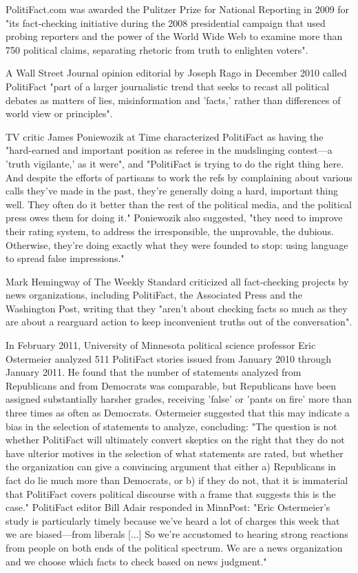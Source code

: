 PolitiFact.com was awarded the Pulitzer Prize for National Reporting in
2009 for "its fact-checking initiative during the 2008 presidential
campaign that used probing reporters and the power of the World Wide Web
to examine more than 750 political claims, separating rhetoric from
truth to enlighten voters".

A Wall Street Journal opinion editorial by Joseph Rago in December 2010
called PolitiFact "part of a larger journalistic trend that seeks to
recast all political debates as matters of lies, misinformation and
'facts,' rather than differences of world view or principles".

TV critic James Poniewozik at Time characterized PolitiFact as having
the "hard-earned and important position as referee in the mudslinging
contest---a 'truth vigilante,' as it were", and "PolitiFact is trying to
do the right thing here. And despite the efforts of partisans to work
the refs by complaining about various calls they've made in the past,
they're generally doing a hard, important thing well. They often do it
better than the rest of the political media, and the political press
owes them for doing it." Poniewozik also suggested, "they need to
improve their rating system, to address the irresponsible, the
unprovable, the dubious. Otherwise, they're doing exactly what they were
founded to stop: using language to spread false impressions."

Mark Hemingway of The Weekly Standard criticized all fact-checking
projects by news organizations, including PolitiFact, the Associated
Press and the Washington Post, writing that they "aren't about checking
facts so much as they are about a rearguard action to keep inconvenient
truths out of the conversation".

In February 2011, University of Minnesota political science professor
Eric Ostermeier analyzed 511 PolitiFact stories issued from January 2010
through January 2011. He found that the number of statements analyzed
from Republicans and from Democrats was comparable, but Republicans have
been assigned substantially harsher grades, receiving 'false' or 'pants
on fire' more than three times as often as Democrats. Ostermeier
suggested that this may indicate a bias in the selection of statements
to analyze, concluding: "The question is not whether PolitiFact will
ultimately convert skeptics on the right that they do not have ulterior
motives in the selection of what statements are rated, but whether the
organization can give a convincing argument that either a) Republicans
in fact do lie much more than Democrats, or b) if they do not, that it
is immaterial that PolitiFact covers political discourse with a frame
that suggests this is the case." PolitiFact editor Bill Adair responded
in MinnPost: "Eric Ostermeier's study is particularly timely because
we've heard a lot of charges this week that we are biased---from
liberals {[}...{]} So we're accustomed to hearing strong reactions from
people on both ends of the political spectrum. We are a news
organization and we choose which facts to check based on news judgment."

